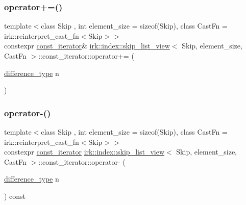 \mbox{\label{structirk_1_1index_1_1skip__list__view_1_1const__iterator_a60b3457446cc57d73b0957e193f40674}} 
\subsubsection{\texorpdfstring{operator+=()}{operator+=()}}
{\footnotesize\ttfamily template$<$class Skip , int element\+\_\+size = sizeof(\+Skip), class Cast\+Fn  = irk\+::reinterpret\+\_\+cast\+\_\+fn$<$\+Skip$>$$>$ \\
constexpr \mbox{\hyperlink{structirk_1_1index_1_1skip__list__view_1_1const__iterator}{const\+\_\+iterator}}\& \mbox{\hyperlink{classirk_1_1index_1_1skip__list__view}{irk\+::index\+::skip\+\_\+list\+\_\+view}}$<$ Skip, element\+\_\+size, Cast\+Fn $>$\+::const\+\_\+iterator\+::operator+= (\begin{DoxyParamCaption}\item[{\mbox{\hyperlink{structirk_1_1index_1_1skip__list__view_1_1const__iterator_afcba20bb907a231114679979015f77f5}{difference\+\_\+type}}}]{n }\end{DoxyParamCaption})\hspace{0.3cm}{\ttfamily [inline]}}

\mbox{\label{structirk_1_1index_1_1skip__list__view_1_1const__iterator_a68650913d3271ded33a0ee4663836ff2}} 
\subsubsection{\texorpdfstring{operator-\/()}{operator-()}}
{\footnotesize\ttfamily template$<$class Skip , int element\+\_\+size = sizeof(\+Skip), class Cast\+Fn  = irk\+::reinterpret\+\_\+cast\+\_\+fn$<$\+Skip$>$$>$ \\
constexpr \mbox{\hyperlink{structirk_1_1index_1_1skip__list__view_1_1const__iterator}{const\+\_\+iterator}} \mbox{\hyperlink{classirk_1_1index_1_1skip__list__view}{irk\+::index\+::skip\+\_\+list\+\_\+view}}$<$ Skip, element\+\_\+size, Cast\+Fn $>$\+::const\+\_\+iterator\+::operator-\/ (\begin{DoxyParamCaption}\item[{\mbox{\hyperlink{structirk_1_1index_1_1skip__list__view_1_1const__iterator_afcba20bb907a231114679979015f77f5}{difference\+\_\+type}}}]{n }\end{DoxyParamCaption}) const\hspace{0.3cm}{\ttfamily [inline]}}

